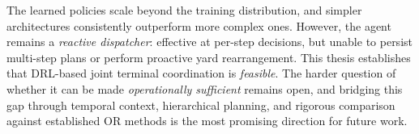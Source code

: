 The learned policies scale beyond the training distribution, and simpler architectures consistently outperform more complex ones. However, the agent remains a \emph{reactive dispatcher}: effective at per-step decisions, but unable to persist multi-step plans or perform proactive yard rearrangement. This thesis establishes that DRL-based joint terminal coordination is \emph{feasible}. The harder question of whether it can be made \emph{operationally sufficient} remains open, and bridging this gap through temporal context, hierarchical planning, and rigorous comparison against established OR methods is the most promising direction for future work.
